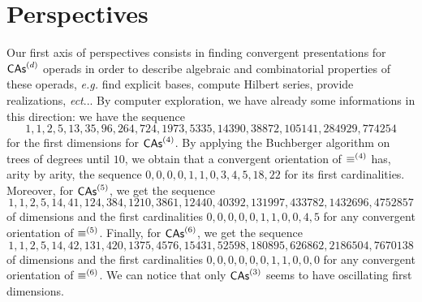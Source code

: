 \section*{Perspectives}


Our first axis of perspectives consists in finding convergent
presentations for $\mathsf{CAs}^{\left(d\right)}$ operads in order to describe algebraic and
combinatorial properties of these operads, \emph{e.g.} find explicit bases,
compute Hilbert series, provide realizations, \emph{ect}... By computer
exploration, we have already some informations in this direction: we have
the sequence
\begin{equation}
    1, 1, 2, 5, 13, 35, 96, 264, 724, 1973, 5335, 14390, 38872, 105141, 
    284929, 774254
\end{equation}
for the first dimensions for $\mathsf{CAs}^{\left(4\right)}$. By applying the Buchberger
algorithm on trees of degrees until $10$, we obtain that a convergent
orientation of $\operatorname{\equiv}^{(4)}$ has, arity by arity, the sequence
\begin{math}
    0, 0, 0, 0, 1, 1, 0, 3, 4, 5, 18, 22
\end{math}
for its first cardinalities. Moreover, for $\mathsf{CAs}^{\left(5\right)}$, we get the
sequence
\begin{equation}
1, 1, 2, 5, 14, 41, 124, 384, 1210, 3861, 12440, 40392, 131997, 
433782, 1432696, 4752857
\end{equation}
of dimensions and the first cardinalities
\begin{math}
    0, 0, 0, 0, 0, 1, 1, 0, 0, 4, 5
\end{math}
for any convergent orientation of $\operatorname{\equiv}^{(5)}$. Finally, for
$\mathsf{CAs}^{\left(6\right)}$, we get the sequence
\begin{equation}
   1, 1, 2, 5, 14, 42, 131, 420, 1375, 4576, 15431, 52598, 
   180895, 626862, 2186504, 7670138
\end{equation}
of dimensions and the first cardinalities
\begin{math}
    0, 0, 0, 0, 0, 0, 1, 1, 0, 0, 0
\end{math}
for any convergent orientation of $\operatorname{\equiv}^{(6)}$. We can notice that
only $\mathsf{CAs}^{\left(3\right)}$ seems to have oscillating first dimensions. 
\medbreak

